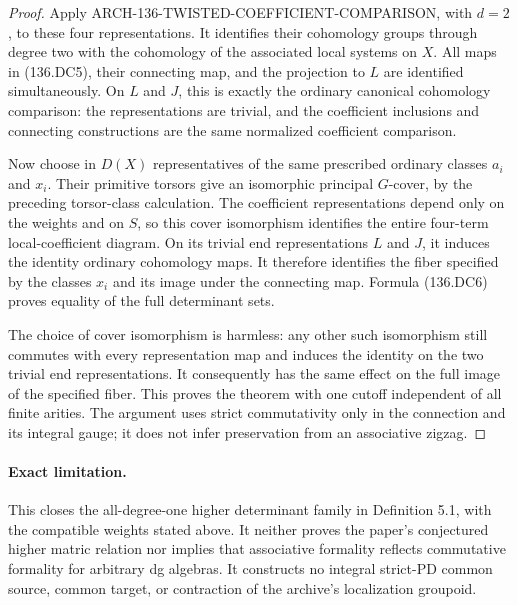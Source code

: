 \begin{proof}
Apply ARCH-136-TWISTED-COEFFICIENT-COMPARISON, with \(d=2\), to these four
representations. It identifies their cohomology groups through degree
two with the cohomology of the associated local systems on \(X\).
All maps in (136.DC5), their connecting map, and the projection to \(L\)
are identified simultaneously. On \(L\) and \(J\), this is exactly the
ordinary canonical cohomology comparison: the representations are
trivial, and the coefficient inclusions and connecting constructions
are the same normalized coefficient comparison.

Now choose in \(D(X)\) representatives of the same prescribed ordinary
classes \(a_i\) and \(x_i\). Their primitive torsors give an isomorphic
principal \(G\)-cover, by the preceding torsor-class calculation.
The coefficient representations depend only on the weights and on
\(S\), so this cover isomorphism identifies the entire four-term
local-coefficient diagram. On its trivial end representations \(L\)
and \(J\), it induces the identity ordinary cohomology maps.
It therefore identifies the fiber specified by the classes \(x_i\)
and its image under the connecting map.
Formula (136.DC6) proves equality of the full determinant sets.

The choice of cover isomorphism is harmless: any other such isomorphism
still commutes with every representation map and induces the identity
on the two trivial end representations. It consequently has the same
effect on the full image of the specified fiber.
This proves the theorem with one cutoff independent of all finite
arities. The argument uses strict commutativity only in the connection
and its integral gauge; it does not infer preservation from an
associative zigzag.
\end{proof}

\paragraph{Exact limitation.}
This closes the all-degree-one higher determinant family in Definition
5.1, with the compatible weights stated above. It neither proves the
paper's conjectured higher matric relation nor implies that associative
formality reflects commutative formality for arbitrary dg algebras.
It constructs no integral strict-PD common source, common target, or
contraction of the archive's localization groupoid.

